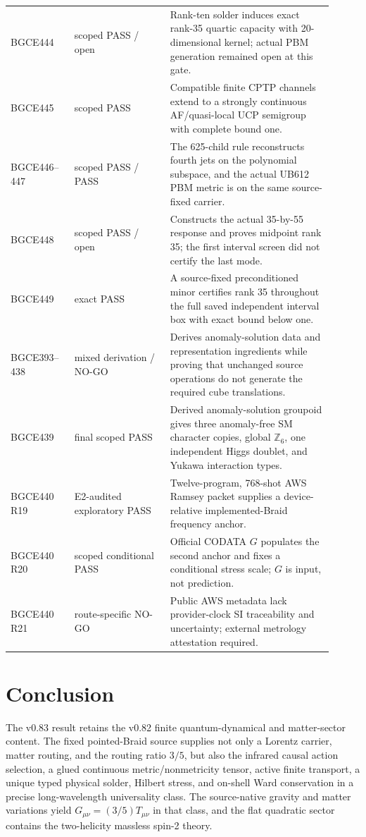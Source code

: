 \documentclass[11pt]{article}
\theoremstyle{definition}
\theoremstyle{remark}
\begin{document}
\begin{longtable}{>{\raggedright\arraybackslash}p{0.18\linewidth} >{\raggedright\arraybackslash}p{0.27\linewidth} >{\raggedright\arraybackslash}p{0.46\linewidth}}
BGCE444 & scoped PASS / open & Rank-ten solder induces exact rank-35 quartic capacity with 20-dimensional kernel; actual PBM generation remained open at this gate. \\
BGCE445 & scoped PASS & Compatible finite CPTP channels extend to a strongly continuous AF/quasi-local UCP semigroup with complete bound one. \\
BGCE446--447 & scoped PASS / PASS & The 625-child rule reconstructs fourth jets on the polynomial subspace, and the actual UB612 PBM metric is on the same source-fixed carrier. \\
BGCE448 & scoped PASS / open & Constructs the actual 35-by-55 response and proves midpoint rank 35; the first interval screen did not certify the last mode. \\
BGCE449 & exact PASS & A source-fixed preconditioned minor certifies rank 35 throughout the full saved independent interval box with exact bound below one. \\
BGCE393--438 & mixed derivation / NO-GO & Derives anomaly-solution data and representation ingredients while proving that unchanged source operations do not generate the required cube translations. \\
BGCE439 & final scoped PASS & Derived anomaly-solution groupoid gives three anomaly-free SM character copies, global $\mathbb Z_6$, one independent Higgs doublet, and Yukawa interaction types. \\
BGCE440 R19 & E2-audited exploratory PASS & Twelve-program, 768-shot AWS Ramsey packet supplies a device-relative implemented-Braid frequency anchor. \\
BGCE440 R20 & scoped conditional PASS & Official CODATA $G$ populates the second anchor and fixes a conditional stress scale; $G$ is input, not prediction. \\
BGCE440 R21 & route-specific NO-GO & Public AWS metadata lack provider-clock SI traceability and uncertainty; external metrology attestation required. \\
\bottomrule
\end{longtable}

\section{Conclusion}

The v0.83 result retains the v0.82 finite quantum-dynamical and matter-sector content. The fixed pointed-Braid source supplies not only a Lorentz carrier, matter routing, and the routing ratio $3/5$, but also the infrared causal action selection, a glued continuous metric/nonmetricity tensor, active finite transport, a unique typed physical solder, Hilbert stress, and on-shell Ward conservation in a precise long-wavelength universality class. The source-native gravity and matter variations yield $G_{\mu\nu}=(3/5)T_{\mu\nu}$ in that class, and the flat quadratic sector contains the two-helicity massless spin-2 theory.
\end{document}
